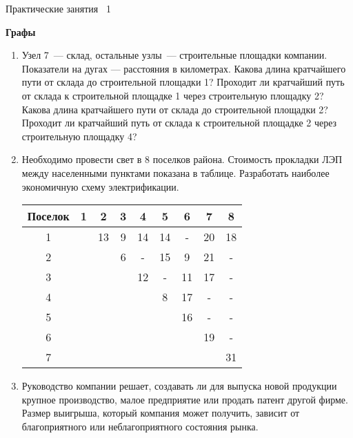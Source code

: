 \documentclass[a4paper,12pt]{extarticle}
\begin{document}
{\centering \small Практические занятия \textnumero~1 \par\bfseries \large Графы \par}

\begin{enumerate}
\item Узел 7~--- склад, остальные узлы~--- строительные площадки компании. 
Показатели на дугах --- расстояния в километрах. 
Какова длина кратчайшего пути от склада до строительной площадки 1? Проходит ли кратчайший путь от склада к строительной площадке 1 через строительную площадку 2? Какова длина кратчайшего пути от склада до строительной площадки 2? Проходит ли кратчайший путь от склада к строительной
площадке 2 через строительную площадку 4?

{\centering
{}
\par}

\item Необходимо провести свет в 8 поселков района. Стоимость прокладки ЛЭП между населенными пунктами показана в таблице. Разработать наиболее экономичную схему электрификации.

{\centering \begin{tabular}{|c|c|c|c|c|c|c|c|c|}
\hline
Поселок & 1 & 2 & 3 & 4 & 5  & 6  & 7 & 8\\
\hline
1 &  & 13 & 9 & 14 & 14 & -  & 20 & 18 \\
\hline
2 &  &    & 6 & -  & 15 & 9  & 21 & - \\
\hline
3 &  &    &   & 12 & -  & 11 & 17 & - \\
\hline
4 &  &    &   &    & 8  & 17 & -  & - \\
\hline
5 &  &    &   &    &    & 16 & -  & - \\
\hline
6 &  &    &   &    &    &    & 19 & - \\
\hline
7 &  &    &   &    &    &    &    & 31 \\
\hline
\end{tabular}\par}
\item 
Руководство компании решает, создавать ли для выпуска новой продукции крупное производство, малое предприятие или продать патент другой фирме. Размер выигрыша, который компания может получить, зависит от благоприятного или неблагоприятного состояния рынка.


\end{enumerate}
\end{document}
